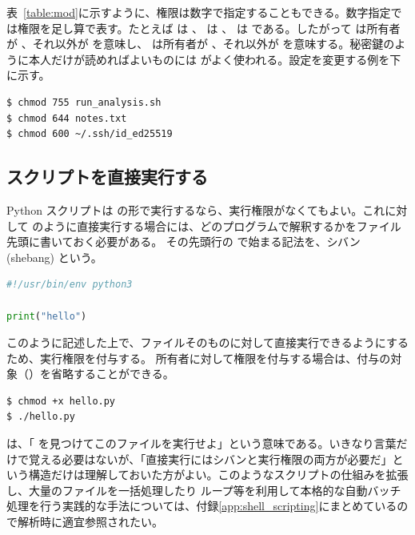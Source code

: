 表~\ref{table:mod}に示すように、権限は数字で指定することもできる。数字指定では権限を足し算で表す。たとえば  は 、 は 、 は  である。したがって  は所有者が 、それ以外が  を意味し、 は所有者が 、それ以外が  を意味する。秘密鍵のように本人だけが読めればよいものには  がよく使われる。設定を変更する例を下に示す。

\begin{lstlisting}[numbers=none, xleftmargin=2\zw]
$ chmod 755 run_analysis.sh
$ chmod 644 notes.txt
$ chmod 600 ~/.ssh/id_ed25519
\end{lstlisting}

\subsection{スクリプトを直接実行する}

Python スクリプトは  の形で実行するなら、実行権限がなくてもよい。これに対して  のように直接実行する場合には、どのプログラムで解釈するかをファイル先頭に書いておく必要がある。
その先頭行の \code{\#!} で始まる記法を、シバン (shebang) という。

\begin{lstlisting}[language=Python]
#!/usr/bin/env python3

print("hello")
\end{lstlisting}

このように記述した上で、ファイルそのものに対して直接実行できるようにするため、実行権限を付与する。
所有者に対して権限を付与する場合は、付与の対象（）を省略することができる。

\begin{lstlisting}[numbers=none, xleftmargin=2\zw]
$ chmod +x hello.py
$ ./hello.py
\end{lstlisting}

 は、「 を見つけてこのファイルを実行せよ」という意味である。いきなり言葉だけで覚える必要はないが、「直接実行にはシバンと実行権限の両方が必要だ」という構造だけは理解しておいた方がよい。このようなスクリプトの仕組みを拡張し、大量のファイルを一括処理したり  ループ等を利用して本格的な自動バッチ処理を行う実践的な手法については、付録\ref{app:shell_scripting}にまとめているので解析時に適宜参照されたい。
